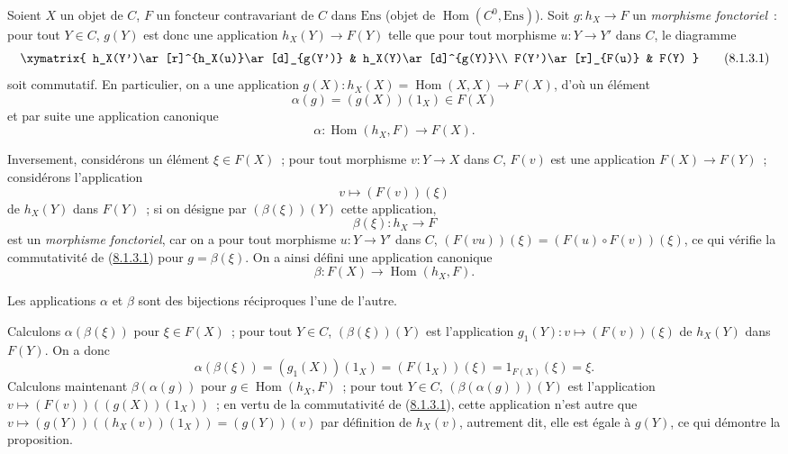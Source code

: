 \begin{env}[8.1.3]
\label{0.8.1.3-fr}
Soient $X$ un objet de $C$, $F$ un foncteur contravariant de $C$ dans
$\mathrm{Ens}$ (objet de $\operatorname{Hom}(C^0,\mathrm{Ens})$). Soit
$g:h_X\to F$ un \emph{morphisme fonctoriel}~: pour tout $Y\in C$,
$g(Y)$ est donc une application $h_X(Y)\to F(Y)$ telle que pour tout morphisme
$u:Y\to Y'$ dans $C$, le diagramme
\[
  \xymatrix{
    h_X(Y')\ar[r]^{h_X(u)}\ar[d]_{g(Y')} &
    h_X(Y)\ar[d]^{g(Y)}\\
    F(Y')\ar[r]_{F(u)} & F(Y)
  }
  \tag{8.1.3.1}\label{0.8.1.3.1-fr}
\]
soit commutatif. En particulier, on a une application
$g(X):h_X(X)=\operatorname{Hom}(X,X)\to F(X)$, d'où un élément
\[
  \alpha(g)=(g(X))(1_X)\in F(X)
  \tag{8.1.3.2}
\]
et par suite une application canonique
\[
  \alpha:\operatorname{Hom}(h_X,F)\to F(X).
  \tag{8.1.3.3}
\]

Inversement, considérons un élément $\xi\in F(X)$~; pour tout morphisme
$v:Y\to X$ dans $C$, $F(v)$ est une application $F(X)\to F(Y)$~;
considérons l'application
\[
  v\mapsto(F(v))(\xi)
  \tag{8.1.3.4}
\]
de $h_X(Y)$ dans $F(Y)$~; si on désigne par $(\beta(\xi))(Y)$ cette
application,
\[
  \beta(\xi):h_X\to F
  \tag{8.1.3.5}
\]
est un \emph{morphisme fonctoriel}, car on a pour tout morphisme
$u:Y\to Y'$ dans $C$,
$(F(vu))(\xi)=(F(u)\circ F(v))(\xi)$, ce qui vérifie la commutativité de
(\hyperref[0.8.1.3.1-fr]{8.1.3.1}) pour $g=\beta(\xi)$. On a ainsi défini
une application canonique
\[
  \beta:F(X)\to\operatorname{Hom}(h_X,F).
  \tag{8.1.3.6}
\]
\end{env}

\begin{proposition}[8.1.4]
\label{0.8.1.4-fr}
Les applications $\alpha$ et $\beta$ sont des bijections réciproques l'une de
l'autre.
\end{proposition}

Calculons $\alpha(\beta(\xi))$ pour $\xi\in F(X)$~; pour tout $Y\in C$,
$(\beta(\xi))(Y)$ est l'application
$g_1(Y):v\mapsto(F(v))(\xi)$ de $h_X(Y)$ dans $F(Y)$. On a donc
\[
  \alpha(\beta(\xi))=(g_1(X))(1_X)=(F(1_X))(\xi)
  =1_{F(X)}(\xi)=\xi.
\]
Calculons maintenant $\beta(\alpha(g))$ pour
$g\in\operatorname{Hom}(h_X,F)$~; pour tout $Y\in C$,
$(\beta(\alpha(g)))(Y)$ est l'application
$v\mapsto(F(v))((g(X))(1_X))$~; en vertu de la commutativité de
(\hyperref[0.8.1.3.1-fr]{8.1.3.1}), cette application n'est autre que
$v\mapsto(g(Y))((h_X(v))(1_X))=(g(Y))(v)$ par définition de $h_X(v)$,
autrement dit, elle est égale à $g(Y)$, ce qui démontre la proposition.

